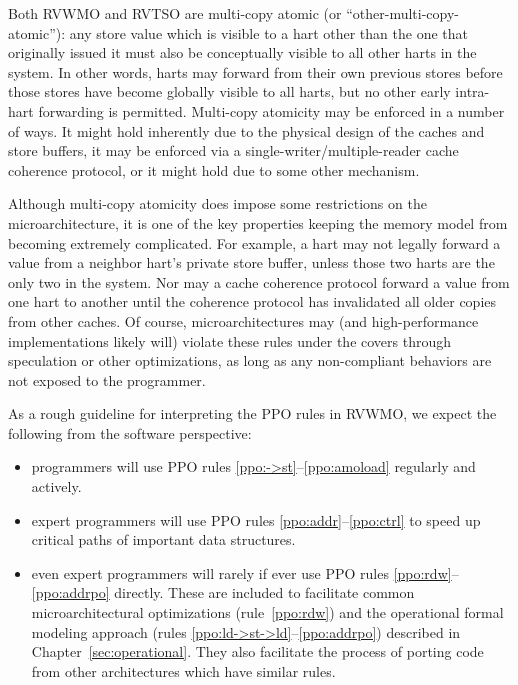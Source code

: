 Both RVWMO and RVTSO are multi-copy atomic (or ``other-multi-copy-atomic''): any store value which is visible to a hart other than the one that originally issued it must also be conceptually visible to all other harts in the system.
In other words, harts may forward from their own previous stores before those stores have become globally visible to all harts, but no other early intra-hart forwarding is permitted.
Multi-copy atomicity may be enforced in a number of ways.
It might hold inherently due to the physical design of the caches and store buffers, it may be enforced via a single-writer/multiple-reader cache coherence protocol, or it might hold due to some other mechanism.

Although multi-copy atomicity does impose some restrictions on the microarchitecture, it is one of the key properties keeping the memory model from becoming extremely complicated.
For example, a hart may not legally forward a value from a neighbor hart's private store buffer, unless those two harts are the only two in the system.
Nor may a cache coherence protocol forward a value from one hart to another until the coherence protocol has invalidated all older copies from other caches.
Of course, microarchitectures may (and high-performance implementations likely will) violate these rules under the covers through speculation or other optimizations, as long as any non-compliant behaviors are not exposed to the programmer.

As a rough guideline for interpreting the PPO rules in RVWMO, we expect the following from the software perspective:
\begin{itemize}
  \item programmers will use PPO rules \ref{ppo:->st}--\ref{ppo:amoload} regularly and actively.
  \item expert programmers will use PPO rules \ref{ppo:addr}--\ref{ppo:ctrl} to speed up critical paths of important data structures.
  \item even expert programmers will rarely if ever use PPO rules \ref{ppo:rdw}--\ref{ppo:addrpo} directly.  These are included to facilitate common microarchitectural optimizations (rule~\ref{ppo:rdw}) and the operational formal modeling approach (rules \ref{ppo:ld->st->ld}--\ref{ppo:addrpo}) described in Chapter~\ref{sec:operational}.  They also facilitate the process of porting code from other architectures which have similar rules.
\end{itemize}

